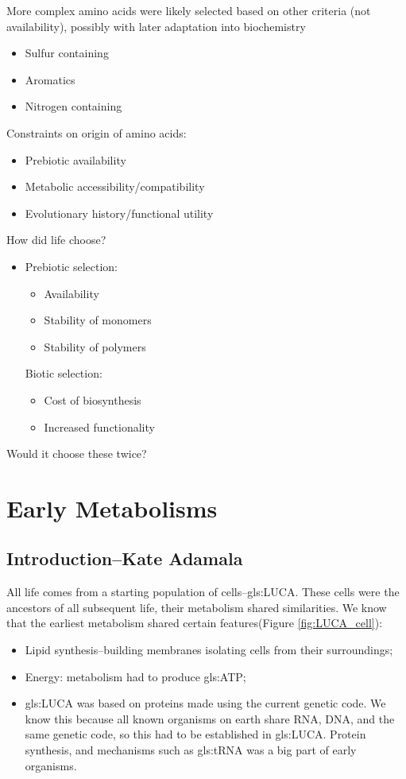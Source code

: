 \documentclass[]{article}
\begin{document}
 More complex amino acids were likely selected based on other criteria (not 
availability), possibly with later adaptation into biochemistry
\begin{itemize}
	\item  Sulfur containing
	\item Aromatics
	\item Nitrogen containing
\end{itemize}
Constraints on origin of amino acids:

\begin{itemize}
	\item  Prebiotic availability
	\item  Metabolic accessibility/compatibility
	\item  Evolutionary history/functional utility
\end{itemize}

How did life choose?

\begin{itemize}
	\item Prebiotic selection:
	\begin{itemize}
		\item 	Availability
		\item Stability of monomers
		\item Stability of polymers
	\end{itemize}
	Biotic selection:
	\begin{itemize}
		\item 	Cost of biosynthesis
		\item Increased functionality
	\end{itemize}
\end{itemize}
Would it choose these twice?

\section{Early Metabolisms}

\subsection[Introduction]{Introduction--Kate Adamala}

All life comes from a starting population of cells--\gls{gls:LUCA}. These cells were the ancestors of all subsequent life, their metabolism shared similarities. We know that the earliest metabolism shared certain features(Figure \ref {fig:LUCA_cell}):
\begin{itemize}
	\item Lipid synthesis--building membranes isolating cells from their surroundings;
	\item Energy: metabolism had to produce \gls{gls:ATP};
	\item \gls{gls:LUCA} was based on proteins made using the current genetic code. We know this because all known organisms on earth share RNA, DNA, and the same genetic code, so this had to be established in \gls{gls:LUCA}. Protein synthesis, and mechanisms such as \gls{gls:tRNA} was a big part of early organisms. 
\end{itemize}
\end{document}
